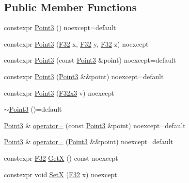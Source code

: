 \subsection*{Public Member Functions}
\begin{DoxyCompactItemize}
\item 
constexpr \mbox{\hyperlink{structmage_1_1_point3_a5615d9dddc6cedf47df9047fd23b7833}{Point3}} () noexcept=default
\item 
constexpr \mbox{\hyperlink{structmage_1_1_point3_ade2447542de93cfeeb7209cdfa3051e7}{Point3}} (\mbox{\hyperlink{namespacemage_aa97e833b45f06d60a0a9c4fc22ae02c0}{F32}} x, \mbox{\hyperlink{namespacemage_aa97e833b45f06d60a0a9c4fc22ae02c0}{F32}} y, \mbox{\hyperlink{namespacemage_aa97e833b45f06d60a0a9c4fc22ae02c0}{F32}} z) noexcept
\item 
constexpr \mbox{\hyperlink{structmage_1_1_point3_a1efeee54fe0401b52c90c8abe045ec37}{Point3}} (const \mbox{\hyperlink{structmage_1_1_point3}{Point3}} \&point) noexcept=default
\item 
constexpr \mbox{\hyperlink{structmage_1_1_point3_ae0c52aa09a4daec05a7b61eaed205866}{Point3}} (\mbox{\hyperlink{structmage_1_1_point3}{Point3}} \&\&point) noexcept=default
\item 
constexpr \mbox{\hyperlink{structmage_1_1_point3_ae92569a8f17984726f2d0a15ef183aa5}{Point3}} (\mbox{\hyperlink{namespacemage_a1e3c7a882af461f161caa1cbddaf1fa2}{F32x3}} v) noexcept
\item 
\mbox{\hyperlink{structmage_1_1_point3_a952151b6ff72b68569f95445c2ac2495}{$\sim$\+Point3}} ()=default
\item 
\mbox{\hyperlink{structmage_1_1_point3}{Point3}} \& \mbox{\hyperlink{structmage_1_1_point3_aaf94d246281f433cdbd1391bfedc55cb}{operator=}} (const \mbox{\hyperlink{structmage_1_1_point3}{Point3}} \&point) noexcept=default
\item 
\mbox{\hyperlink{structmage_1_1_point3}{Point3}} \& \mbox{\hyperlink{structmage_1_1_point3_a37ccf01cf7b610d4b17aa7a7888a443c}{operator=}} (\mbox{\hyperlink{structmage_1_1_point3}{Point3}} \&\&point) noexcept=default
\item 
constexpr \mbox{\hyperlink{namespacemage_aa97e833b45f06d60a0a9c4fc22ae02c0}{F32}} \mbox{\hyperlink{structmage_1_1_point3_a94373be88e1cf76819b1c458860299dd}{GetX}} () const noexcept
\item 
constexpr void \mbox{\hyperlink{structmage_1_1_point3_a62c79c14704a8f53e571d693aafa8471}{SetX}} (\mbox{\hyperlink{namespacemage_aa97e833b45f06d60a0a9c4fc22ae02c0}{F32}} x) noexcept

\end{DoxyCompactItemize}
